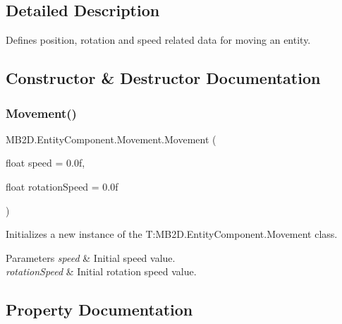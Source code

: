 \subsection{Detailed Description}
Defines position, rotation and speed related data for moving an entity. 



\subsection{Constructor \& Destructor Documentation}
\hypertarget{class_m_b2_d_1_1_entity_component_1_1_movement_a12d8169b44077ab8683db91208d81542}{}\label{class_m_b2_d_1_1_entity_component_1_1_movement_a12d8169b44077ab8683db91208d81542} 
\subsubsection{\texorpdfstring{Movement()}{Movement()}}
{\footnotesize\ttfamily M\+B2\+D.\+Entity\+Component.\+Movement.\+Movement (\begin{DoxyParamCaption}\item[{float}]{speed = {\ttfamily 0.0f},  }\item[{float}]{rotation\+Speed = {\ttfamily 0.0f} }\end{DoxyParamCaption})\hspace{0.3cm}{\ttfamily [inline]}}



Initializes a new instance of the T\+:\+M\+B2\+D.\+Entity\+Component.\+Movement class. 


\begin{DoxyParams}{Parameters}
{\em speed} & Initial speed value.\\
\hline
{\em rotation\+Speed} & Initial rotation speed value.\\
\hline
\end{DoxyParams}


\subsection{Property Documentation}
\hypertarget{class_m_b2_d_1_1_entity_component_1_1_movement_a289388b190b703874afecff7cd5ac450}{}\label{class_m_b2_d_1_1_entity_component_1_1_movement_a289388b190b703874afecff7cd5ac450} 
